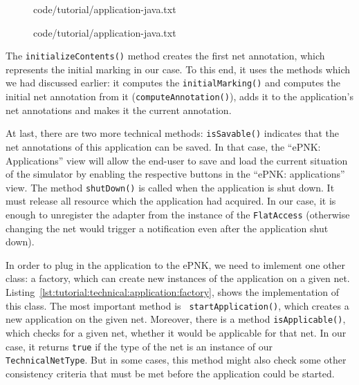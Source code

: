 \begin{figure}[htbp!]
%
  {code/tutorial/application-java.txt}
\end{figure}

\begin{figure}[htbp!]
%
  {code/tutorial/application-java.txt}
\end{figure}

The {\tt initializeContents()} method creates the first net annotation, which
represents the initial marking in our case. To this end, it uses the methods
which we had discussed earlier: it computes the {\tt initialMarking()} and computes
the initial net annotation from it ({\tt computeAnnotation()}),
adds it to the application's net annotations and makes it the current
annotation.

At last, there are two more technical methods: {\tt isSavable()} indicates that
the net annotations of this application can be saved. In that case, the ``ePNK:
Applications'' view will allow the end-user to save and load the current
situation of the simulator by enabling the respective buttons in the ``ePNK:
applications''  view. 
The method {\tt shutDown()} is called when the application is shut down. It must release all resource which
the application had acquired. In our case, it is enough to unregister the
adapter from the instance of the {\tt FlatAccess} (otherwise changing the net would
trigger a notification even after the application shut down).

In order to plug in the application to the ePNK, we need to imlement one other
class: a factory, which can create new instances of the application on a given
net. Listing~\ref{lst:tutorial:technical:application:factory}, shows the
implementation of this class. The most important method is {\tt
startApplication()}, which creates a new application on the given net. Moreover,
there is a method {\tt isApplicable()}, which checks for a given net,
whether it would be applicable for that net. In our case, it returns {\tt true} if the
type of the net is an instance of our {\tt TechnicalNetType}. But in some cases,
this method might also check some other consistency criteria that must be met
before the application could be started.

